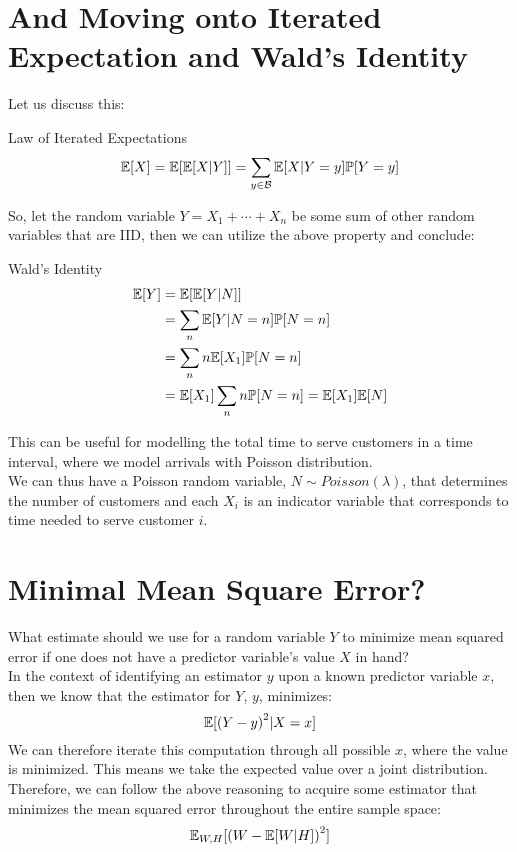 \section{And Moving onto Iterated Expectation and Wald's Identity}
Let us discuss this:
\begin{ln-theorem}{Law of Iterated Expectations}{}
    \[
        \mathbb{E}[X] = \mathbb{E}[\mathbb{E}[X | Y]] = \sum_{y \in \mathcal{B}} \mathbb{E}[X | Y = y] \mathbb{P}[Y = y]
    \]
\end{ln-theorem}

So, let the random variable $Y = X_1 + \cdots + X_n$ be some sum of other random variables that are IID, then we can utilize the above property and conclude:
\begin{ln-theorem}{Wald's Identity}{}
    \begin{align*}
        \mathbb{E}[Y] &= \mathbb{E}[\mathbb{E}[Y | N]] \\
        &= \sum_n \mathbb{E}[Y | N = n] \mathbb{P}[N = n] \\
        &= \sum_n n \mathbb{E}[X_1] \mathbb{P}[N = n] \\
        &= \mathbb{E}[X_1] \sum_n n\mathbb{P}[N = n] = \mathbb{E}[X_1] \mathbb{E}[N]
    \end{align*}
\end{ln-theorem}

This can be useful for modelling the total time to serve customers in a time interval, where we model arrivals with Poisson distribution. \\
We can thus have a Poisson random variable, $N \sim Poisson(\lambda)$, that determines the number of customers and each $X_i$ is an indicator variable that corresponds to time needed to serve customer $i$.

\section{Minimal Mean Square Error?}
What estimate should we use for a random variable $Y$ to minimize mean squared error if one does not have a predictor variable's value $X$ in hand? \\
In the context of identifying an estimator $y$ upon a known predictor variable $x$, then we know that the estimator for $Y$, $y$, minimizes:
\[\mathbb{E}[{(Y - y)}^2 | X = x]\]
We can therefore iterate this computation through all possible $x$, where the value is minimized. This means we take the expected value over a joint distribution. \\
Therefore, we can follow the above reasoning to acquire some estimator that minimizes the mean squared error throughout the entire sample space:
\[
    \mathbb{E}_{W, H}[{(W - \mathbb{E}[W | H])}^2]
\]

